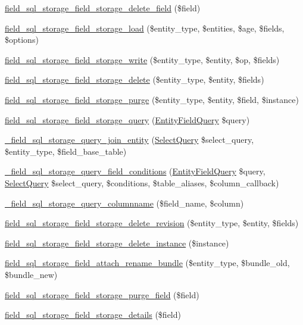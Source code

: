 \begin{DoxyCompactItemize}
\item 
\hyperlink{field__sql__storage_8module_a7c690572c051b48b3ced474ed7852069}{field\_\-sql\_\-storage\_\-field\_\-storage\_\-delete\_\-field} (\$field)
\item 
\hyperlink{field__sql__storage_8module_ac0155a0370b9e98b7cf3f8cc3646b98e}{field\_\-sql\_\-storage\_\-field\_\-storage\_\-load} (\$entity\_\-type, \$entities, \$age, \$fields, \$options)
\item 
\hyperlink{field__sql__storage_8module_ac365998e2e667d3521edacc843ca8640}{field\_\-sql\_\-storage\_\-field\_\-storage\_\-write} (\$entity\_\-type, \$entity, \$op, \$fields)
\item 
\hyperlink{field__sql__storage_8module_a7a0c84776ec288e40108b28829288983}{field\_\-sql\_\-storage\_\-field\_\-storage\_\-delete} (\$entity\_\-type, \$entity, \$fields)
\item 
\hyperlink{field__sql__storage_8module_a8f4c04189fdcc7d90daa2f28d2032c3b}{field\_\-sql\_\-storage\_\-field\_\-storage\_\-purge} (\$entity\_\-type, \$entity, \$field, \$instance)
\item 
\hyperlink{field__sql__storage_8module_a39226b4cd56767ac4bce73474bc67f32}{field\_\-sql\_\-storage\_\-field\_\-storage\_\-query} (\hyperlink{classEntityFieldQuery}{EntityFieldQuery} \$query)
\item 
\hyperlink{field__sql__storage_8module_a7af17b34c4165de73746e8cd1b59332b}{\_\-field\_\-sql\_\-storage\_\-query\_\-join\_\-entity} (\hyperlink{classSelectQuery}{SelectQuery} \$select\_\-query, \$entity\_\-type, \$field\_\-base\_\-table)
\item 
\hyperlink{field__sql__storage_8module_a5d8aad839c8e69178faa95e4e4741133}{\_\-field\_\-sql\_\-storage\_\-query\_\-field\_\-conditions} (\hyperlink{classEntityFieldQuery}{EntityFieldQuery} \$query, \hyperlink{classSelectQuery}{SelectQuery} \$select\_\-query, \$conditions, \$table\_\-aliases, \$column\_\-callback)
\item 
\hyperlink{field__sql__storage_8module_acf597397277e34b6a3621e2d2162e6d8}{\_\-field\_\-sql\_\-storage\_\-query\_\-columnname} (\$field\_\-name, \$column)
\item 
\hyperlink{field__sql__storage_8module_a40aaf2be81e9ed697296e13b3bbb2644}{field\_\-sql\_\-storage\_\-field\_\-storage\_\-delete\_\-revision} (\$entity\_\-type, \$entity, \$fields)
\item 
\hyperlink{field__sql__storage_8module_a0646a22038721ad2583c98c9d4ce0389}{field\_\-sql\_\-storage\_\-field\_\-storage\_\-delete\_\-instance} (\$instance)
\item 
\hyperlink{field__sql__storage_8module_ad51eeafab2d7207352b5ad5acbd43b2c}{field\_\-sql\_\-storage\_\-field\_\-attach\_\-rename\_\-bundle} (\$entity\_\-type, \$bundle\_\-old, \$bundle\_\-new)
\item 
\hyperlink{field__sql__storage_8module_a0558bcbbe1f62e3670e884c7620281e5}{field\_\-sql\_\-storage\_\-field\_\-storage\_\-purge\_\-field} (\$field)
\item 
\hyperlink{field__sql__storage_8module_ae0618fa2f4e32ba78edb89651b8832cd}{field\_\-sql\_\-storage\_\-field\_\-storage\_\-details} (\$field)
\end{DoxyCompactItemize}


